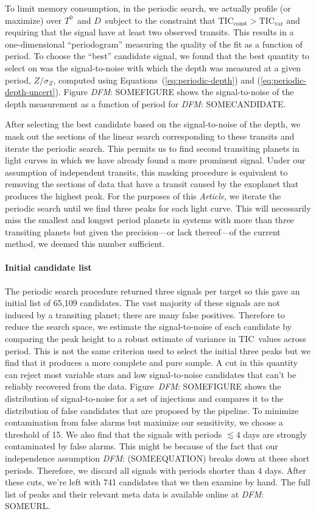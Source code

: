 \documentclass[12pt,preprint]{aastex}
\newcommand{\paper}{\textsl{Article}}
\newcommand{\TIC}{{\ensuremath{\mathrm{TIC}}}}
\newcommand{\todo}[3]{{\color{#2}\emph{#1}: #3}}
\newcommand{\dfmtodo}[1]{\todo{DFM}{red}{#1}}
\newcommand{\phase}{{\ensuremath{T^0}}}
\newcommand{\duration}{{\ensuremath{D}}}
\newcommand{\depth}{{\ensuremath{Z}}}
\begin{document}
To limit memory consumption, in the periodic search, we actually profile (or
maximize) over \phase\ and \duration\ subject to the constraint that
$\TIC_\mathrm{const} > \TIC_\mathrm{var}$ and requiring that the signal have
at least two observed transits.
This results in a one-dimensional ``periodogram'' measuring the quality of
the fit as a function of period.
To choose the ``best'' candidate signal, we found that the best quantity to
select on was the signal-to-noise with which the depth was measured at a
given period, $\depth/\sigma_\depth$, computed using
Equations~(\ref{eq:periodic-depth}) and (\ref{eq:periodic-depth-uncert}).
Figure \dfmtodo{SOMEFIGURE} shows the signal-to-noise of the depth measurement as a
function of period for \dfmtodo{SOMECANDIDATE}.

After selecting the best candidate based on the signal-to-noise of the depth,
we mask out the sections of the linear search corresponding to these transits
and iterate the periodic search.
This permits us to find second transiting planets in light curves in which
we have already found a more prominent signal.
Under our assumption of independent transits, this masking procedure is equivalent to removing
the sections of data that have a transit caused by the exoplanet that produces the highest peak.
For the purposes of this \paper, we iterate the periodic search until we find
three peaks for each light curve.
This will necessarily miss the smallest and longest period planets in systems
with more than three transiting planets but given the precision---or lack
thereof---of the current method, we deemed this number sufficient.


\paragraph{Initial candidate list}

The periodic search procedure returned three signals per target so this gave
an initial list of 65,109 candidates.
The vast majority of these signals are not induced by a transiting planet;
there are many false positives.
Therefore to reduce the search space, we estimate the signal-to-noise of each
candidate by comparing the peak height to a robust estimate of variance in
\TIC\ values across period.
This is not the same criterion used to select the initial three peaks but we
find that it produces a more complete and pure sample.
A cut in this quantity can reject most variable stars and low signal-to-noise
candidates that can't be reliably recovered from the data.
Figure~\dfmtodo{SOMEFIGURE} shows the distribution of signal-to-noise for a set of
injections and compares it to the distribution of false candidates that are
proposed by the pipeline.
To minimize contamination from false alarms but maximize our sensitivity, we
choose a threshold of 15.
We also find that the signals with periods $\lesssim 4$ days are strongly
contaminated by false alarms.
This might be because of the fact that our independence assumption
\dfmtodo{(SOMEEQUATION)} breaks down at these short periods.
Therefore, we discard all signals with periods shorter than 4 days.
After these cuts, we're left with 741 candidates that we then examine by hand.
The full list of peaks and their relevant meta data is available online at
\dfmtodo{SOMEURL}.
\end{document}
